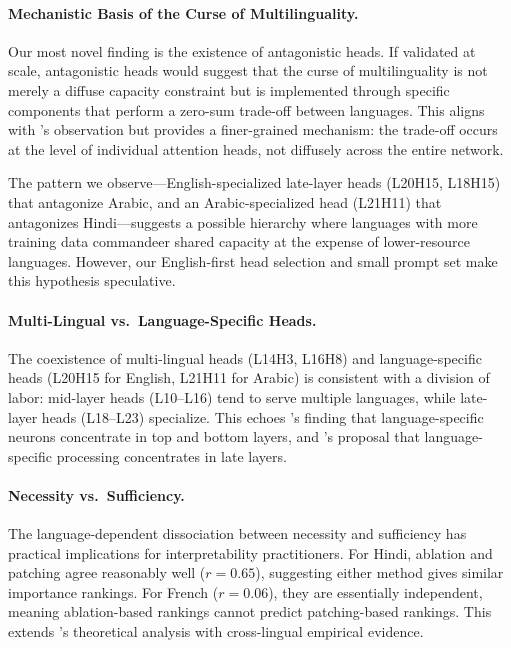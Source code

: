 \documentclass[11pt]{article}
\begin{document}
\paragraph{Mechanistic Basis of the Curse of Multilinguality.}
Our most novel finding is the existence of antagonistic heads.
If validated at scale, antagonistic heads would suggest that the curse of multilinguality is not merely a diffuse capacity constraint but is implemented through specific components that perform a zero-sum trade-off between languages.
This aligns with \citet{conneau2020unsupervised}'s observation but provides a finer-grained mechanism: the trade-off occurs at the level of individual attention heads, not diffusely across the entire network.

The pattern we observe---English-specialized late-layer heads (L20H15, L18H15) that antagonize Arabic, and an Arabic-specialized head (L21H11) that antagonizes Hindi---suggests a possible hierarchy where languages with more training data commandeer shared capacity at the expense of lower-resource languages.
However, our English-first head selection and small prompt set make this hypothesis speculative.

\paragraph{Multi-Lingual vs.\ Language-Specific Heads.}
The coexistence of multi-lingual heads (L14H3, L16H8) and language-specific heads (L20H15 for English, L21H11 for Arabic) is consistent with a division of labor: mid-layer heads (L10--L16) tend to serve multiple languages, while late-layer heads (L18--L23) specialize.
This echoes \citet{tang2024language}'s finding that language-specific neurons concentrate in top and bottom layers, and \citet{zhao2024crosslingual}'s proposal that language-specific processing concentrates in late layers.

\paragraph{Necessity vs.\ Sufficiency.}
The language-dependent dissociation between necessity and sufficiency has practical implications for interpretability practitioners.
For Hindi, ablation and patching agree reasonably well ($r = 0.65$), suggesting either method gives similar importance rankings.
For French ($r = 0.06$), they are essentially independent, meaning ablation-based rankings cannot predict patching-based rankings.
This extends \citet{li2024optimal}'s theoretical analysis with cross-lingual empirical evidence.
\end{document}
